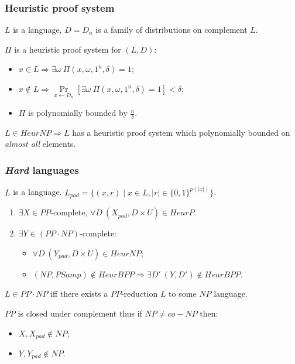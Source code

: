 \begin{frame}
    \frametitle{Heuristic proof system}

    $L$ is a language, $D = {D_n}$ is a family of distributions on
    complement $L$.

    \pause
    \begin{definition}
        $\Pi$ is a heuristic proof system for $(L, D)$:
        \begin{itemize}
            \item $x \in L \Rightarrow \exists \omega~\Pi(x, \omega,
        		1^n, \delta) = 1$;
            \item $x \notin L \Rightarrow
        		\Pr\limits_{x \gets D_n}[\exists \omega~
                \Pi(x, \omega, 1^n, \delta) = 1] < \delta$;
             \item $\Pi$ is polynomially bounded by $\frac{n}{\delta}$.
        \end{itemize}
    \end{definition}

    $L \in HeurNP \Rightarrow L$ has a heuristic proof system which polynomially
    bounded on \textit{almost all} elements.
\end{frame}


\begin{frame}
    \frametitle{\textit{Hard} languages}

    $L$ is a language.
    $L_{pad} = \{(x, r) \mid x \in L, |r| \in \{0, 1 \}^{p(|x|)}\}$.

    \begin{theorem}
        \begin{enumerate}
            \item $\exists X \in PP$-complete, $\forall D~
	    		(X_{pad}, D \times U) \in HeurP$.
    		\pause
    		\item $\exists Y \in (PP \cdot NP)$-complete:
		        \begin{itemize}
        	        \item $\forall D~ (Y_{pad}, D \times U) \in HeurNP$;
                	\item $(NP, PSamp) \notin HeurBPP \Rightarrow \exists D'~ (Y, D')
                		\notin HeurBPP$.
		        \end{itemize}
        		
        \end{enumerate}
    \end{theorem}

    $L \in PP \cdot NP$ iff there exists a $PP$-reduction $L$ to some $NP$ language.
    
    \pause

    \vspace{0.5cm}
    $PP$ is closed under complement thus if $NP \neq co-NP$ then:
    \begin{itemize}
    	\item $X, X_{pad} \notin NP$;
    	\item $Y, Y_{pad} \notin NP$.
    \end{itemize}
 
\end{frame}




